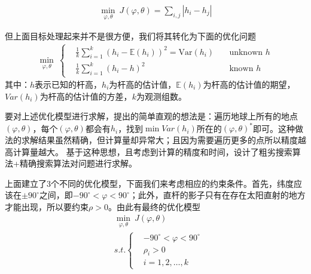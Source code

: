             \begin{align*}
            \min_{\varphi,\theta}\ J(\varphi,\theta) = \sum_{i,j}|h_i-h_j|
            \end{align*}
            \par
            但上面目标处理起来并不是很方便，我们将其转化为下面的优化问题
            \begin{align*}
            \min_{\varphi,\theta}\ \left\{
            \begin{aligned}
            & \frac{1}{k}\sum_{i=1}^k(h_i - \mathbb{E}(h_i))^2 = \mathrm{Var}(h_i)\quad&  \text{unknown }h\\
            & \frac{1}{k}\sum_{i=1}^k(h_i-h)^2 \quad&  \text{known }h
            \end{aligned}
            \right.
            \end{align*}
            其中：$h$表示已知的杆高，$h_i$为杆高的估计值，$\mathbb{E}(h_i)$为杆高的估计值的期望，$Var(h_i)$为杆高的估计值的方差，$k$为观测组数。
            \par
            要对上述优化模型进行求解，提出的简单直观的想法是：遍历地球上所有的地点$(\varphi,\theta)$，每个$(\varphi,\theta)$都会有$h_i$，找到$\min Var(h_i )$所在的$(\varphi,\theta)^*$即可。这种做法的求解结果虽然精确，但计算量却异常大；且因为需要遍历更多的点所以精度越高计算量越大。
            基于这种思想，且考虑到计算的精度和时间，设计了粗劣搜索算法+精确搜索算法对问题进行求解。
            \par
            上面建立了3个不同的优化模型，下面我们来考虑相应的约束条件。首先，纬度应该在$\pm 90^\circ$之间，即$-90^\circ<\varphi<90^\circ$；此外，直杆的影子只有在存在太阳直射的地方才能出现，所以要约束$\rho>0$。由此有最终的优化模型
            \begin{align*}
            & \min_{\varphi,\theta}\ J(\varphi,\theta)\\
            & s.t.\left\{
            \begin{aligned}
            & -90^\circ<\varphi<90^\circ\\
            & \rho_i>0\\
            & i=1,2,\dots,k
            \end{aligned}
            \right.
            \end{align*}


